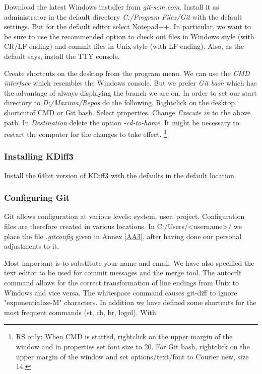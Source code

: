 \documentclass[../Maxima_Workbook.tex]{subfiles}
\begin{document}
Download the latest Windows installer from \emph{git-scm.com}. Install it as administrator in the default directory \emph{C:/Program Files/Git} with the default settings. But for the default editor select Notepad++. In particular, we want to be sure to use the recommended option to check out files in Windows style (with CR/LF ending) and commit files in Unix style (with LF ending). Also, as the default says, install the TTY console.

\lz Create shortcuts on the desktop from the program menu. We can use the \emph{CMD interface} which resembles the Windows console. But we prefer \emph{Git bash} which has the advantage of always displaying the branch we are on. In order to set our start directory to \emph{D:/Maxima/Repos} do the following. Rightclick on the desktop shortcutof CMD or Git bash. Select properties. Change \emph{Execute in} to the above path. In \emph{Destination} delete the option \emph{-cd-to-home}. It might be necessary to restart the computer for the changes to take effect. \footnote{RS only: When CMD is started, rightclick on the upper margin of the window and in properties set font size to 20. For Git bash, rightclick on the upper margin of the window and set options/text/font to Courier new, size 14.}

\subsubsection{Installing KDiff3}

Install the 64bit version of KDiff3 with the defaults in the default location.

\subsubsection{Configuring Git}\label{EE3}

Git allows configuration at various levels: system, user, project. Configuration files are therefore created in various locations. In C:/Users/<username>/ we place the file \emph{.gitconfig} given in Annex \ref{AA3}, after having done our personal adjustments to it.

\lz Most important is to substitute your name and email. We have also specified the text editor to be used for commit messages and the merge tool. The autocrlf command allows for the correct transformation of line endings from Unix to Windows and vice versa. The whitespace command causes git-diff to ignore "exponentialize-M" characters. In addition we have defined some shortcuts for the most frequent commands (st, ch, br, logol). With
\end{document}
